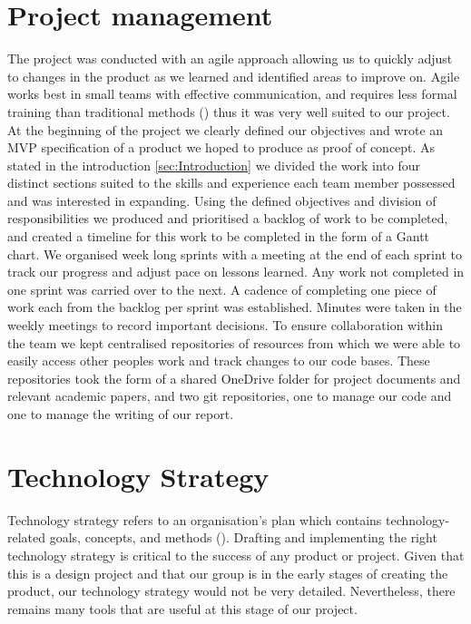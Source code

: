 \section{Project management}
\label{sec:Project management}
The project was conducted with an agile approach allowing us to quickly adjust to changes in the product as we learned and identified areas to improve on.
Agile works best in small teams with effective communication, and requires less formal training than traditional methods (\cite{Agile}) thus it was very well suited to our project. 
At the beginning of the project we clearly defined our objectives and wrote an MVP specification of a product we hoped to produce as proof of concept.
As stated in the introduction \cref{sec:Introduction} we divided the work into four distinct sections suited to the skills and experience each team member possessed and was interested in expanding.
Using the defined objectives and division of responsibilities we produced and prioritised a backlog of work to be completed, and created a timeline for this work to be completed in the form of a Gantt chart.
We organised week long sprints with a meeting at the end of each sprint to track our progress and adjust pace on lessons learned. 
Any work not completed in one sprint was carried over to the next.
A cadence of completing one piece of work each from the backlog per sprint was established.
Minutes were taken in the weekly meetings to record important decisions.
To ensure collaboration within the team we kept centralised repositories of resources from which we were able to easily access other peoples work and track changes to our code bases.
These repositories took the form of a shared OneDrive folder for project documents and relevant academic papers, and two git repositories, one to manage our code and one to manage the writing of our report.


\section{Technology Strategy}
\label{sec:techstrategy}
Technology strategy refers to an organisation's plan which contains technology-related goals, concepts, and methods (\cite{techstratdefinition}). Drafting and implementing the right technology strategy is critical to the success of any product or project. Given that this is a design project and that our group is in the early stages of creating the product, our technology strategy would not be very detailed. Nevertheless, there remains many tools that are useful at this stage of our project.

